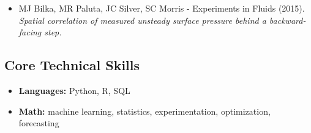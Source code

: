 \documentclass[10pt,letterpaper]{article}
\begin{document}
\begin{paracol}{2}
\begin{rightcolumn}
\begin{itemize}[label={--}, leftmargin={.15in}, rightmargin={.2in}]
    	\item
    		MJ Bilka, MR Paluta, JC Silver, SC Morris - Experiments in Fluids (2015). \emph{Spatial correlation of measured unsteady surface pressure behind a backward-facing step.}

    \end{itemize}

\subsection*{Core Technical Skills}

    \begin{itemize}[label={--}, leftmargin={.15in}, rightmargin={.2in}]
    	\parskip=0.1em
        \item
    	\textbf{Languages:} Python, R, SQL
    	\item
    	\textbf{Math:} machine learning, statistics, experimentation, optimization, forecasting

    \end{itemize}

\end{rightcolumn}
\end{paracol}
\end{document}
